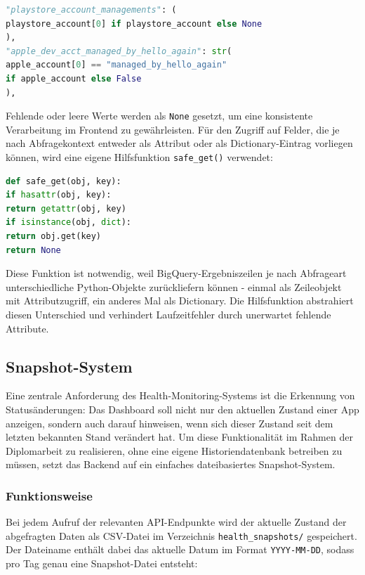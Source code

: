 \begin{lstlisting}[language=Python, caption={Beispiel von Extraktion von Array-Feldern aus BigQuery-Ergebnissen}, label={lst:array-extraction}]
"playstore_account_managements": (
playstore_account[0] if playstore_account else None
),
"apple_dev_acct_managed_by_hello_again": str(
apple_account[0] == "managed_by_hello_again"
if apple_account else False
),
\end{lstlisting}

Fehlende oder leere Werte werden als \texttt{None} gesetzt, um eine konsistente Verarbeitung im Frontend zu gewährleisten. Für den Zugriff auf Felder, die je nach Abfragekontext entweder als Attribut oder als Dictionary-Eintrag vorliegen können, wird eine eigene Hilfsfunktion \texttt{safe\_get()} verwendet:

\begin{lstlisting}[language=Python, caption={Hilfsfunktion safe\_get() für flexiblen Feldzugriff}, label={lst:safe-get}]
def safe_get(obj, key):
if hasattr(obj, key):
return getattr(obj, key)
if isinstance(obj, dict):
return obj.get(key)
return None
\end{lstlisting}

Diese Funktion ist notwendig, weil BigQuery-Ergebniszeilen je nach Abfrageart unterschiedliche Python-Objekte zurückliefern können - einmal als Zeileobjekt mit Attributzugriff, ein anderes Mal als Dictionary. Die Hilfsfunktion abstrahiert diesen Unterschied und verhindert Laufzeitfehler durch unerwartet fehlende Attribute.

\subsection{Snapshot-System}
Eine zentrale Anforderung des Health-Monitoring-Systems ist die Erkennung von Statusänderungen: Das Dashboard soll nicht nur den aktuellen Zustand einer App anzeigen, sondern auch darauf hinweisen, wenn sich dieser Zustand seit dem letzten bekannten Stand verändert hat. Um diese Funktionalität im Rahmen der Diplomarbeit zu realisieren, ohne eine eigene Historiendatenbank betreiben zu müssen, setzt das Backend auf ein einfaches dateibasiertes Snapshot-System.

\subsubsection{Funktionsweise}
Bei jedem Aufruf der relevanten API-Endpunkte wird der aktuelle Zustand der abgefragten Daten als CSV-Datei im Verzeichnis \texttt{health\_snapshots/} gespeichert. Der Dateiname enthält dabei das aktuelle Datum im Format \texttt{YYYY-MM-DD}, sodass pro Tag genau eine Snapshot-Datei entsteht:

